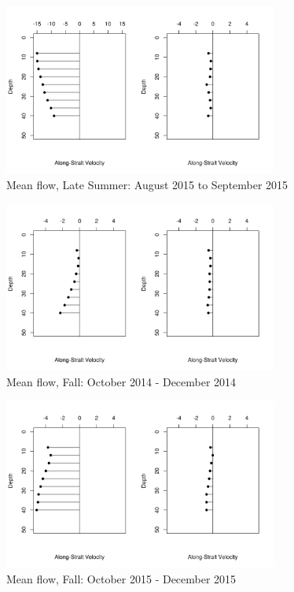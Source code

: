\documentclass[12pt]{dforeport}
\begin{document}
\begin{figure}  
\centering
\includegraphics[width = 0.8\textwidth]{./figures/39_smf_lateSummer_2015.png}
\caption[Mean flow, Late Summer, 2015]{Mean flow, Late Summer: August 2015 to September 2015}
\label{f:smf_ls_2015}
\end{figure}


\begin{figure}  
\centering
\includegraphics[width = 0.8\textwidth]{./figures/40_smf_fall_2014.png}
\caption[Mean flow, Fall, 2014]{Mean flow, Fall: October 2014 - December 2014}
\label{f:smf_f_2014}
\end{figure}

\begin{figure}  
\centering
\includegraphics[width = 0.8\textwidth]{./figures/41_smf_fall_2015.png}
\caption[Mean flow, Fall, 2015]{Mean flow, Fall: October 2015 - December 2015}
\label{f:smf_f_2015}
\end{figure}
\end{document}
